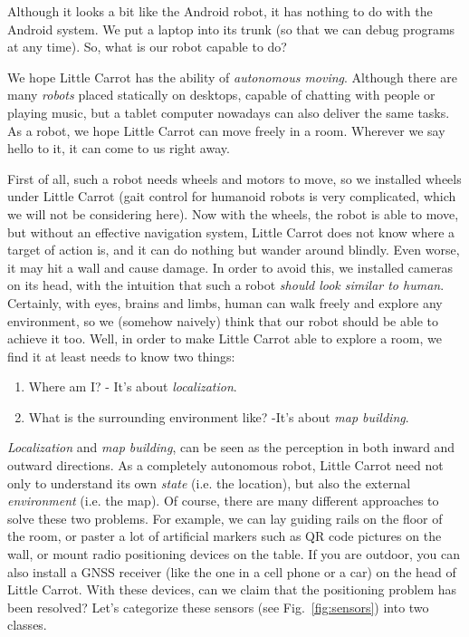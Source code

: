 Although it looks a bit like the Android robot, it has nothing to do with the Android system. We put a laptop into its trunk (so that we can debug programs at any time). So, what is our robot capable to do?

We hope Little Carrot has the ability of \emph{autonomous moving}. Although there are many \emph{robots} placed statically on desktops, capable of chatting with people or playing music, but a tablet computer nowadays can also deliver the same tasks. As a robot, we hope Little Carrot can move freely in a room. Wherever we say hello to it, it can come to us right away.

First of all, such a robot needs wheels and motors to move, so we installed wheels under Little Carrot (gait control for humanoid robots is very complicated, which we will not be considering here). Now with the wheels, the robot is able to move, but without an effective navigation system, Little Carrot does not know where a target of action is, and it can do nothing but wander around blindly. Even worse, it may hit a wall and cause damage. In order to avoid this, we installed cameras on its head, with the intuition that such a robot \emph{should look similar to human}. Certainly, with eyes, brains and limbs, human can walk freely and explore any environment, so we (somehow naively) think that our robot should be able to achieve it too. Well, in order to make Little Carrot able to explore a room, we find it at least needs to know two things:

\begin{enumerate}
	\item  Where am I? - It's about \emph{localization}.
	\item What is the surrounding environment like? -It's about \emph{map building}.
\end{enumerate}

\emph{Localization} and \emph{map building}, can be seen as the perception in both inward and outward directions. As a completely autonomous robot, Little Carrot need not only to understand its own \emph{state} (i.e. the location), but also the external \emph{environment} (i.e. the map). Of course, there are many different approaches to solve these two problems. For example, we can lay guiding rails on the floor of the room, or paster a lot of artificial markers such as QR code pictures on the wall, or mount radio positioning devices on the table. If you are outdoor, you can also install a GNSS receiver (like the one in a cell phone or a car) on the head of Little Carrot. With these devices, can we claim that the positioning problem has been resolved? Let's categorize these sensors (see Fig.~\ref{fig:sensors}) into two classes.

